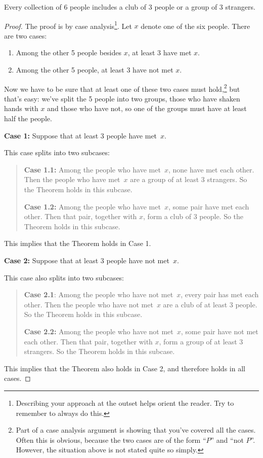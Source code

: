 \begin{theorem*}
Every collection of 6 people includes a club of 3 people or a group of 3
strangers.
\end{theorem*}

\begin{proof}
The proof is by case analysis\footnote{Describing your approach at the
outset helps orient the reader.  Try to remember to always do this.}.
Let $x$ denote one of the six people.  There are two cases:

\begin{enumerate}
\item\label{3met} Among the other 5 people besides $x$, at least 3 have met
  $x$.

\item \label{3notmet} Among the other 5 people, at least 3 have not met
  $x$.
\end{enumerate}

Now we have to be sure that at least one of these two cases must
hold,\footnote{Part of a case analysis argument is showing that you've
  covered all the cases.  Often this is obvious, because the two cases
  are of the form ``$P$'' and ``not $P$''.  However, the situation
  above is not stated quite so simply.} but that's easy: we've split
the 5 people into two groups, those who have shaken hands with $x$ and
those who have not, so one of the groups must have at least half the
people.

\textbf{Case 1:}  Suppose that at least 3 people have met~$x$.

This case splits into two subcases:
\begin{quote}

\textbf{Case 1.1:} Among the people who have met~$x$, none have
met each other.  Then the people who have met~$x$ are a group of
at least 3 strangers.  So the Theorem holds in this subcase.

\textbf{Case 1.2:} Among the people who have met~$x$, some pair
have met each other.  Then that pair, together with $x$, form a club
of 3 people.  So the Theorem holds in this subcase.

\end{quote}
This implies that the Theorem holds in Case 1.

\textbf{Case 2:} Suppose that at least 3 people have not met~$x$.

This case also splits into two subcases:
\begin{quote}

\textbf{Case 2.1}: Among the people who have not met~$x$, every pair
has met each other.  Then the people who have not met~$x$ are a club of
at least 3 people.  So the Theorem holds in this subcase.

\textbf{Case 2.2:} Among the people who have not met~$x$, some pair
have not met each other.  Then that pair, together with $x$, form a
group of at least 3 strangers.  So the Theorem holds in this subcase.

\end{quote}
This implies that the Theorem also holds in Case 2, and therefore holds in
all cases.
\end{proof}


